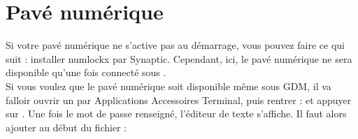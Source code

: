 \section{Pavé numérique}
Si votre pavé numérique ne s'active pas au démarrage, vous pouvez faire ce qui suit : installer numlockx par Synaptic. Cependant, ici, le pavé numérique ne sera disponible qu'une fois connecté sous .\\
Si vous voulez que le pavé numérique soit disponible même sous GDM, il va falloir ouvrir un  par Applications \FlecheDroite Accessoires \FlecheDroite Terminal, puis rentrer :  et appuyer sur . Une fois le mot de passe renseigné, l'éditeur de texte s'affiche. Il faut alors ajouter au début du fichier :
